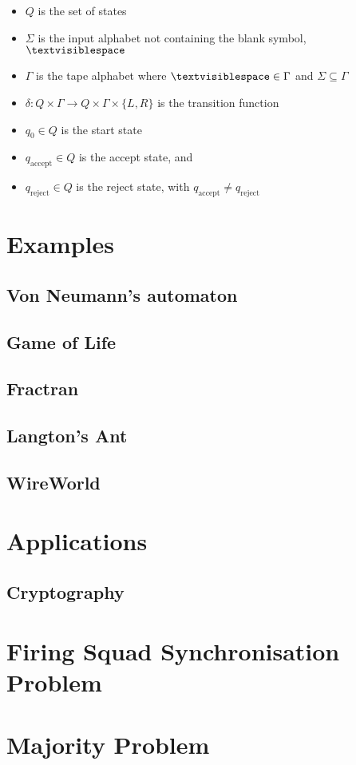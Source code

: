 \documentclass[11pt,a4paper]{article}
\begin{document}
    \begin{itemize}
        \item $Q$ is the set of states
        \item $\Sigma$ is the input alphabet not containing the blank symbol,
            $\textvisiblespace$
        \item $\Gamma$ is the tape alphabet where $\textvisiblespace \in \Gamma$
            and $\Sigma \subseteq \Gamma$
        \item $\delta: Q \times \Gamma \rightarrow Q \times \Gamma \times
            \{L,R\}$ is the transition function
        \item $q_0 \in Q$ is the start state
        \item $q_{\text{accept}} \in Q$ is the accept state, and
        \item $q_{\text{reject}} \in Q$ is the reject state, with
            $q_{\text{accept}} \neq q_{\text{reject}}$
    \end{itemize}

\section{Examples}
    \subsection{Von Neumann's automaton}
    \subsection{Game of Life}
    \subsection{Fractran}
    \subsection{Langton's Ant}
    \subsection{WireWorld}
\section{Applications}
    \subsection{Cryptography}
\section{Firing Squad Synchronisation Problem}
\section{Majority Problem}


\end{document}
